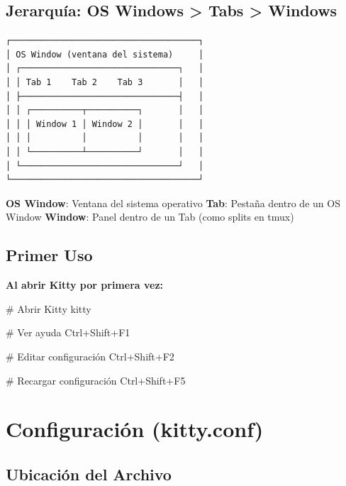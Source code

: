 \documentclass[
  doc,
  floatsintext,
  longtable,
  a4paper,
  nolmodern,
  notxfonts,
  notimes,
  12pt,
  colorlinks=true,linkcolor=blue,citecolor=blue,urlcolor=blue]{apa7}
\newenvironment{Shaded}{\begin{snugshade}}{\end{snugshade}}
\newcommand{\CommentTok}[1]{\textcolor[rgb]{0.37,0.37,0.37}{#1}}
\newcommand{\ExtensionTok}[1]{\textcolor[rgb]{0.00,0.23,0.31}{#1}}
\begin{document}
\subsection{Jerarquía: OS Windows \textgreater{} Tabs \textgreater{}
Windows}\label{jerarquuxeda-os-windows-tabs-windows}

\begin{verbatim}
┌─────────────────────────────────────┐
│ OS Window (ventana del sistema)     │
│ ┌───────────────────────────────┐   │
│ │ Tab 1    Tab 2    Tab 3       │   │
│ ├───────────────────────────────┤   │
│ │ ┌──────────┬──────────┐       │   │
│ │ │ Window 1 │ Window 2 │       │   │
│ │ │          │          │       │   │
│ │ └──────────┴──────────┘       │   │
│ └───────────────────────────────┘   │
└─────────────────────────────────────┘
\end{verbatim}

\textbf{OS Window}: Ventana del sistema operativo \textbf{Tab}: Pestaña
dentro de un OS Window \textbf{Window}: Panel dentro de un Tab (como
splits en tmux)

\subsection{Primer Uso}\label{primer-uso}

\textbf{Al abrir Kitty por primera vez:}

\begin{Shaded}
\begin{Highlighting}[]
\CommentTok{\# Abrir Kitty}
\ExtensionTok{kitty}

\CommentTok{\# Ver ayuda}
\ExtensionTok{Ctrl+Shift+F1}

\CommentTok{\# Editar configuración}
\ExtensionTok{Ctrl+Shift+F2}

\CommentTok{\# Recargar configuración}
\ExtensionTok{Ctrl+Shift+F5}
\end{Highlighting}
\end{Shaded}

\section{Configuración (kitty.conf)}\label{configuraciuxf3n-kitty.conf}

\subsection{Ubicación del Archivo}\label{ubicaciuxf3n-del-archivo}
\end{document}
